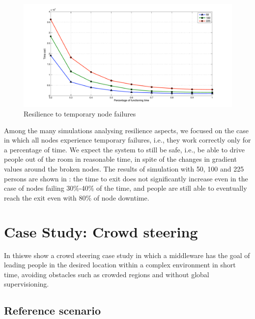 \documentclass[12pt,a4paper,twoside,openright]{book}
\begin{document}
\begin{figure}
  \begin{center}
  \includegraphics[width=\columnwidth]{img/resilience}
  \end{center}
  \caption{Resilience to temporary node failures}
  \label{fig:resilience}
\end{figure}

Among the many simulations analysing resilience aspects, we focused on the case in which all nodes experience temporary failures, i.e., they  work correctly only for a percentage of time.
%
We expect the system to still be safe, i.e., be able to drive people out of the room in reasonable time, in spite of the changes in gradient values around the broken nodes. 
%
The results of simulation with 50, 100 and 225 persons are shown in : the time to exit does not significantly increase even in the case of nodes failing 30\%-40\% of the time, and people are still able to eventually reach the exit even with 80\% of node downtime.


\chapter{Case Study: Crowd steering}
\label{jos-museum}
In this\levelText{}we show a crowd steering case study in which a middleware has the goal of leading people in the desired location within a complex environment in short time, avoiding obstacles such as crowded regions and without global supervisioning. 

\section{Reference scenario}
\end{document}
